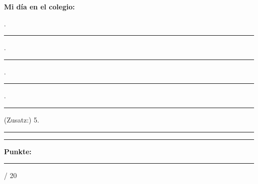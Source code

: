 \documentclass[11pt, a4paper]{article}
\newcommand{\maxpunkte}{20}
\newcommand{\luecke}[1]{\rule{#1}{0.4pt}}
\begin{document}
\vspace{0.5em}

\noindent
\textbf{Mi día en el colegio:}

\vspace{0.5em}

. \luecke{14cm}

\vspace{1em}

. \luecke{14cm}

\vspace{1em}

. \luecke{14cm}

\vspace{1em}

. \luecke{14cm}

\vspace{1em}

\noindent
(Zusatz:) 5. \luecke{14cm}


\vspace{20pt}
\hrule
\vspace{10pt}

\begin{flushright}
\textbf{Punkte:} \luecke{1cm} / \maxpunkte
\end{flushright}
\end{document}
